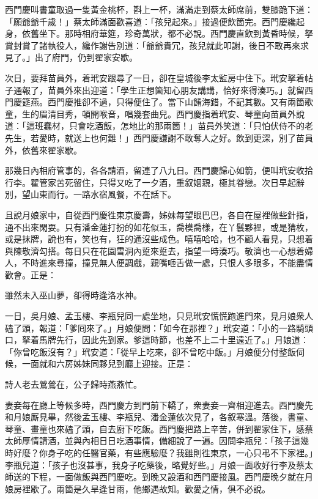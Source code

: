 西門慶叫書童取過一隻黃金桃杯，斟上一杯，滿滿走到蔡太師席前，雙膝跪下道：「願爺爺千歲！」蔡太師滿面歡喜道：「孩兒起來。」接過便飲箇完。西門慶纔起身，依舊坐下。那時相府華筵，珍奇萬狀，都不必說。西門慶直飲到黃昏時候，拏賞封賞了諸執役人，纔作謝告別道：「爺爺貴冗，孩兒就此叩謝，後日不敢再來求見了。」出了府門，仍到翟家安歇。

次日，要拜苗員外，着玳安跟尋了一日，卻在皇城後李太監房中住下。玳安拏着帖子通報了，苗員外來出迎道：「學生正想箇知心朋友講講，恰好來得湊巧。」就留西門慶筵燕。西門慶推卻不過，只得便住了。當下山餚海錯，不記其數。又有兩箇歌童，生的眉清目秀，頓開喉音，唱幾套曲兒。西門慶指着玳安、琴童向苗員外說道：「這班蠢材，只會吃酒飯，怎地比的那兩箇！」苗員外笑道：「只怕伏侍不的老先生，若愛時，就送上也何難！」西門慶謙謝不敢奪人之好。飲到更深，別了苗員外，依舊來翟家歇。

那幾日內相府管事的，各各請酒，留連了八九日。西門慶歸心如箭，便叫玳安收拾行李。翟管家苦死留住，只得又吃了一夕酒，重叙姻親，極其眷戀。次日早起辭別，望山東而行。一路水宿風餐，不在話下。

且說月娘家中，自從西門慶徃東京慶壽，姊妹每望眼巴巴，各自在屋裡做些針指，通不出來閑耍。只有潘金蓮打扮的如花似玉，喬模喬樣，在丫鬟夥裡，或是猜枚，或是抹牌，說也有，笑也有，狂的通沒些成色。嘻嘻哈哈，也不顧人看見，只想着與陳敬濟勾搭。每日只在花園雪洞內踅來踅去，指望一時湊巧。敬濟也一心想着婦人，不時進來尋撞，撞見無人便調戲，親嘴咂舌做一處，只恨人多眼多，不能盡情歡會。正是：

\begin{myquote}
雖然未入巫山夢，卻得時逢洛水神。
\end{myquote}

一日，吳月娘、孟玉樓、李瓶兒同一處坐地，只見玳安慌慌跑進門來，見月娘衆人磕了頭，報道：「爹囘來了。」月娘便問：「如今在那裡？」玳安道：「小的一路騎頭口，拏着馬牌先行，因此先到家。爹這時節，也差不上二十里遠近了。」月娘道：「你曾吃飯沒有？」玳安道：「從早上吃來，卻不曾吃中飯。」月娘便分付整飯伺候，一面就和六房姊妹同夥兒到廳上迎接。正是：

\begin{myquote}
詩人老去鶯鶯在，公子歸時燕燕忙。
\end{myquote}

妻妾每在廳上等候多時，西門慶方到門前下轎了，衆妻妾一齊相迎進去。西門慶先和月娘厮見畢，然後孟玉樓、李瓶兒、潘金蓮依次見了，各叙寒溫。落後，書童、琴童、畫童也來磕了頭，自去廚下吃飯。西門慶把路上辛苦，併到翟家住下，感蔡太師厚情請酒，並與內相日日吃酒事情，備細說了一遍。因問李瓶兒：「孩子這幾時好麼？你身子吃的任醫官藥，有些應驗麼？我雖則徃東京，一心只弔不下家裡。」李瓶兒道：「孩子也沒甚事，我身子吃藥後，略覺好些。」月娘一面收好行李及蔡太師送的下程，一面做飯與西門慶吃。到晚又設酒和西門慶接風。西門慶晚夕就在月娘房裡歇了。兩箇是久旱逢甘雨，他鄉遇故知。歡愛之情，俱不必說。

